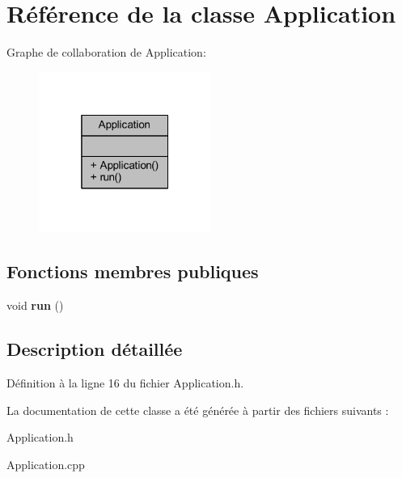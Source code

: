 \hypertarget{class_application}{}\section{Référence de la classe Application}
\label{class_application}


Graphe de collaboration de Application\+:\nopagebreak
\begin{figure}[H]
\begin{center}
\leavevmode
\includegraphics[width=160pt]{class_application__coll__graph}
\end{center}
\end{figure}
\subsection*{Fonctions membres publiques}
\begin{DoxyCompactItemize}
\item 
\hypertarget{class_application_a68965449404743bf1add056784d6cf81}{}\label{class_application_a68965449404743bf1add056784d6cf81} 
void {\bfseries run} ()
\end{DoxyCompactItemize}


\subsection{Description détaillée}


Définition à la ligne 16 du fichier Application.\+h.



La documentation de cette classe a été générée à partir des fichiers suivants \+:\begin{DoxyCompactItemize}
\item 
Application.\+h\item 
Application.\+cpp\end{DoxyCompactItemize}
